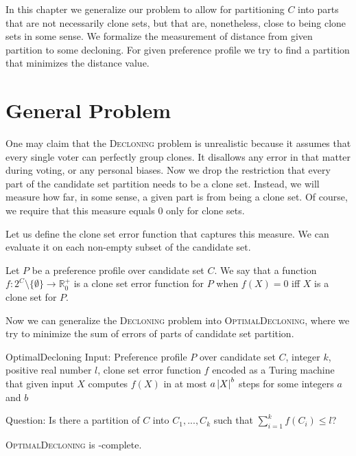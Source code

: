 In this chapter we generalize our problem to allow for partitioning $C$ into parts
that are not necessarily clone sets, but that are, nonetheless, close to being clone sets in some sense.
We formalize the measurement of distance from given partition to some decloning.
For given preference profile we try to find a partition that minimizes the distance value.

\section{General Problem}

One may claim that the \textsc{Decloning} problem is unrealistic
because it assumes that every single voter can perfectly group clones.
It disallows any error in that matter during voting, or any personal biases.
Now we drop the restriction that every part of the candidate set partition needs to be a clone set.
Instead, we will measure how far, in some sense, a given part is from being a clone set.
Of course, we require that this measure equals $0$ only for clone sets.

Let us define the clone set error function that captures this measure.
We can evaluate it on each non-empty subset of the candidate set.

\begin{defn}
Let $P$ be a preference profile over candidate set $C$.
We say that a function
$f: 2^C \setminus \{\emptyset\} \rightarrow \mathbb{R}_0^+$
is a clone set error function for $P$ when $f(X) = 0$ iff $X$ is a clone set for $P$.
\end{defn}

Now we can generalize the \textsc{Decloning} problem into \textsc{OptimalDecloning},
where we try to minimize the sum of errors of parts of candidate set partition.

\begin{problem}{OptimalDecloning}
	Input: Preference profile $P$ over candidate set $C$, integer $k$, positive real number $l$,
        clone set error function $f$ encoded as a Turing machine that given input $X$ computes $f(X)$
        in at most $a \left\vert X \right\vert^b$ steps for some integers $a$ and $b$

	Question: Is there a partition of $C$ into $C_1, ..., C_k$ such that $\sum_{i=1}^k f(C_i) \leq l$?
\end{problem}

\begin{thm} \label{optdecl}
	\textsc{OptimalDecloning} is \np-complete.
\end{thm}

